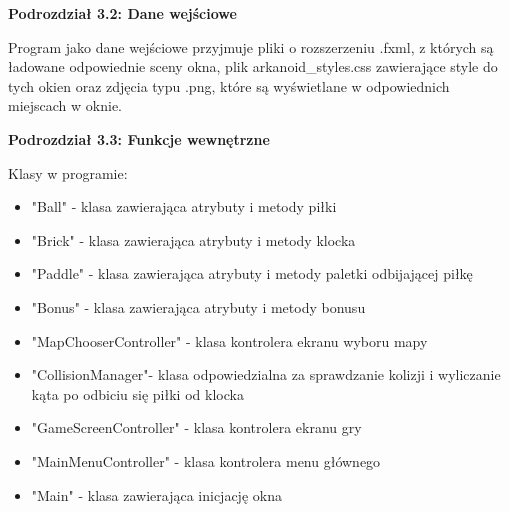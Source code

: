\documentclass[a4paper]{article}
\begin{document}
\bigskip
\textbf{Podrozdzia{\l} 3.2: Dane wej\'sciowe}

Program jako dane wejściowe przyjmuje pliki o rozszerzeniu .fxml, z których są ładowane odpowiednie sceny okna, plik arkanoid\_styles.css zawierające style do tych okien oraz zdjęcia typu .png, które są wyświetlane w odpowiednich miejscach w oknie.

\bigskip
\textbf{Podrozdzia{\l} 3.3: Funkcje wewnętrzne}
\bigskip

Klasy w programie:
\begin{itemize}
\item "Ball" - klasa zawierająca atrybuty i metody piłki
\item "Brick" - klasa zawierająca atrybuty i metody klocka
\item "Paddle" - klasa zawierająca atrybuty i metody paletki odbijającej piłkę
\item "Bonus" - klasa zawierająca atrybuty i metody bonusu
\item "MapChooserController" - klasa kontrolera ekranu wyboru mapy
\item "CollisionManager"- klasa odpowiedzialna za sprawdzanie kolizji i wyliczanie kąta po odbiciu się piłki od klocka
\item "GameScreenController" - klasa kontrolera ekranu gry
\item "MainMenuController" - klasa kontrolera menu głównego
\item "Main" - klasa zawierająca inicjację okna 
\end{itemize}
    
\end{document}
